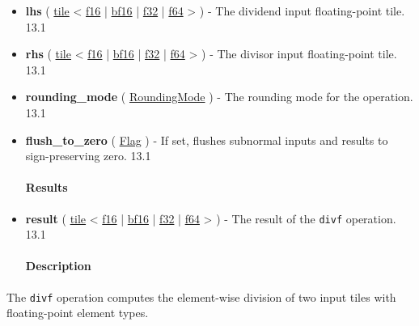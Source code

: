 \documentclass{article}
\begin{document}
\begin{itemize}
\item \textbf{lhs} ( \href{https://docs.nvidia.com/cuda/tile-ir/latest/sections/types.html#type-tile}{tile} < \href{https://docs.nvidia.com/cuda/tile-ir/latest/sections/types.html#subsection-element-types}{f16} | \href{https://docs.nvidia.com/cuda/tile-ir/latest/sections/types.html#subsection-element-types}{bf16} | \href{https://docs.nvidia.com/cuda/tile-ir/latest/sections/types.html#subsection-element-types}{f32} | \href{https://docs.nvidia.com/cuda/tile-ir/latest/sections/types.html#subsection-element-types}{f64} > ) - The dividend input floating-point tile. 13.1
\item \textbf{rhs} ( \href{https://docs.nvidia.com/cuda/tile-ir/latest/sections/types.html#type-tile}{tile} < \href{https://docs.nvidia.com/cuda/tile-ir/latest/sections/types.html#subsection-element-types}{f16} | \href{https://docs.nvidia.com/cuda/tile-ir/latest/sections/types.html#subsection-element-types}{bf16} | \href{https://docs.nvidia.com/cuda/tile-ir/latest/sections/types.html#subsection-element-types}{f32} | \href{https://docs.nvidia.com/cuda/tile-ir/latest/sections/types.html#subsection-element-types}{f64} > ) - The divisor input floating-point tile. 13.1
\item \textbf{rounding\_mode} ( \href{https://docs.nvidia.com/cuda/tile-ir/latest/sections/operations.html#op-attribute-cuda-tile-divf-roundingmode-attr}{RoundingMode} ) - The rounding mode for the operation. 13.1
\item \textbf{flush\_to\_zero} ( \href{https://docs.nvidia.com/cuda/tile-ir/latest/sections/operations.html#type-flag}{Flag} ) - If set, flushes subnormal inputs and results to sign-preserving zero. 13.1


\paragraph{Results}

\item \textbf{result} ( \href{https://docs.nvidia.com/cuda/tile-ir/latest/sections/types.html#type-tile}{tile} < \href{https://docs.nvidia.com/cuda/tile-ir/latest/sections/types.html#subsection-element-types}{f16} | \href{https://docs.nvidia.com/cuda/tile-ir/latest/sections/types.html#subsection-element-types}{bf16} | \href{https://docs.nvidia.com/cuda/tile-ir/latest/sections/types.html#subsection-element-types}{f32} | \href{https://docs.nvidia.com/cuda/tile-ir/latest/sections/types.html#subsection-element-types}{f64} > ) - The result of the \texttt{divf} operation. 13.1


\paragraph{Description}

\end{itemize}
The \texttt{divf} operation computes the element-wise division of two input tiles with floating-point element types.
\end{document}
